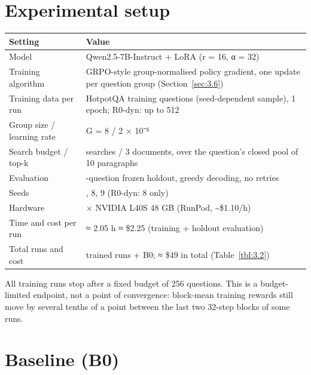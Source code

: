 \section{Experimental setup}\label{sec:4.1}

{\def\LTcaptype{none} %
\begin{longtable}[]{@{}
  >{\raggedright\arraybackslash}p{}
  >{\raggedright\arraybackslash}p{}@{}}
\toprule\noalign{}
\begin{minipage}[b]{\linewidth}\raggedright
Setting
\end{minipage} & \begin{minipage}[b]{\linewidth}\raggedright
Value
\end{minipage} \\
\midrule\noalign{}
\endhead
\bottomrule\noalign{}
\endlastfoot
Model & Qwen2.5-7B-Instruct + LoRA (r = 16, α = 32) \\
Training algorithm & GRPO-style group-normalised policy gradient, one
update per question group (Section~\ref{sec:3.6}) \\
Training data per run & 256 HotpotQA training questions (seed-dependent
sample), 1 epoch; R0-dyn: up to 512 \\
Group size / learning rate & G = 8 / 2 × 10⁻⁵ \\
Search budget / top-k & 3 searches / 3 documents, over the question's
closed pool of 10 paragraphs \\
Evaluation & 300-question frozen holdout, greedy decoding, no retries \\
Seeds & 7, 8, 9 (R0-dyn: 8 only) \\
Hardware & 1 × NVIDIA L40S 48 GB (RunPod, \textasciitilde\$1.10/h) \\
Time and cost per run & ≈ 2.05 h ≈ \$2.25 (training + holdout
evaluation) \\
Total runs and cost & 16 trained runs + B0; ≈ \$49 in total
(Table~\ref{tbl:3.2}) \\
\end{longtable}
}

All training runs stop after a fixed budget of 256 questions. This is a
budget-limited endpoint, not a point of convergence: block-mean training
rewards still move by several tenths of a point between the last two
32-step blocks of some runs.

\section{Baseline (B0)}\label{sec:4.2}

